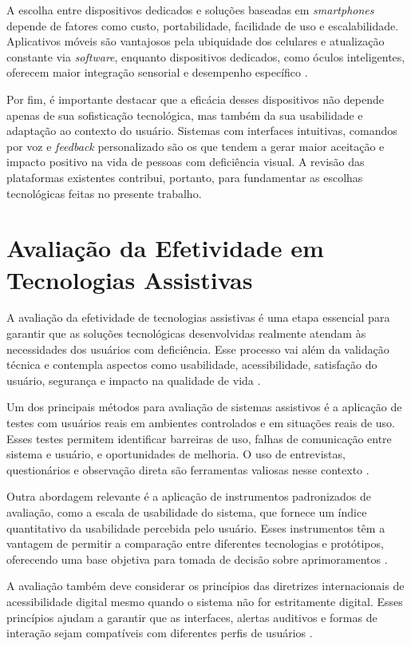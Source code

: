 A escolha entre dispositivos dedicados e soluções baseadas em \textit{smartphones} depende de fatores como custo, portabilidade, facilidade de uso e escalabilidade. Aplicativos móveis são vantajosos pela ubiquidade dos celulares e atualização constante via \textit{software}, enquanto dispositivos dedicados, como óculos inteligentes, oferecem maior integração sensorial e desempenho específico \cite{Saeedi2021}.

Por fim, é importante destacar que a eficácia desses dispositivos não depende apenas de sua sofisticação tecnológica, mas também da sua usabilidade e adaptação ao contexto do usuário. Sistemas com interfaces intuitivas, comandos por voz e \textit{feedback} personalizado são os que tendem a gerar maior aceitação e impacto positivo na vida de pessoas com deficiência visual. A revisão das plataformas existentes contribui, portanto, para fundamentar as escolhas tecnológicas feitas no presente trabalho.

\section{\textbf{Avaliação da Efetividade em Tecnologias Assistivas}}
A avaliação da efetividade de tecnologias assistivas é uma etapa essencial para garantir que as soluções tecnológicas desenvolvidas realmente atendam às necessidades dos usuários com deficiência. Esse processo vai além da validação técnica e contempla aspectos como usabilidade, acessibilidade, satisfação do usuário, segurança e impacto na qualidade de vida \cite{Wentz2013}.

Um dos principais métodos para avaliação de sistemas assistivos é a aplicação de testes com usuários reais em ambientes controlados e em situações reais de uso. Esses testes permitem identificar barreiras de uso, falhas de comunicação entre sistema e usuário, e oportunidades de melhoria. O uso de entrevistas, questionários e observação direta são ferramentas valiosas nesse contexto \cite{Kintsch2002}.

Outra abordagem relevante é a aplicação de instrumentos padronizados de avaliação, como a escala de usabilidade do sistema, que fornece um índice quantitativo da usabilidade percebida pelo usuário. Esses instrumentos têm a vantagem de permitir a comparação entre diferentes tecnologias e protótipos, oferecendo uma base objetiva para tomada de decisão sobre aprimoramentos \cite{Brooke1996}.

A avaliação também deve considerar os princípios das diretrizes internacionais de acessibilidade digital mesmo quando o sistema não for estritamente digital. Esses princípios ajudam a garantir que as interfaces, alertas auditivos e formas de interação sejam compatíveis com diferentes perfis de usuários \cite{W3C2023}.

